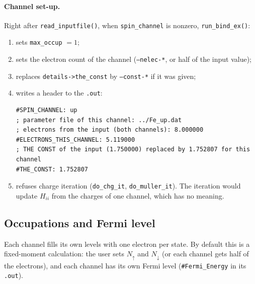 \documentclass[11pt,a4paper]{article}
\newcommand{\fn}[1]{\texttt{#1()}}
\newcommand{\var}[1]{\texttt{#1}}
\newcommand{\opt}[1]{\texttt{#1}}
\begin{document}
\paragraph{Channel set-up.} Right after \fn{read\_inputfile}, when \var{spin\_channel} is
nonzero, \fn{run\_bind\_ex}:
\begin{enumerate}
\item sets \var{max\_occup} $=1$;
\item sets the electron count of the channel (\opt{--nelec-*}, or half of the input value);
\item replaces \var{details->the\_const} by \opt{--const-*} if it was given;
\item writes a header to the \texttt{.out}:
\begin{lstlisting}[style=sh]
#SPIN_CHANNEL: up
; parameter file of this channel: ../Fe_up.dat
; electrons from the input (both channels): 8.000000
#ELECTRONS_THIS_CHANNEL: 5.119000
; THE CONST of the input (1.750000) replaced by 1.752807 for this channel
#THE_CONST: 1.752807
\end{lstlisting}
\item refuses charge iteration (\texttt{do\_chg\_it}, \texttt{do\_muller\_it}). The
  iteration would update $H_{ii}$ from the charges of one channel, which has no meaning.
\end{enumerate}

\subsection{Occupations and Fermi level}\label{sec:spinocc}

Each channel fills its own levels with one electron per state. By default this is a
fixed-moment calculation: the user sets $N_\uparrow$ and $N_\downarrow$ (or each channel
gets half of the electrons), and each channel has its own Fermi level
(\texttt{\#Fermi\_Energy} in its \texttt{.out}).
\end{document}
